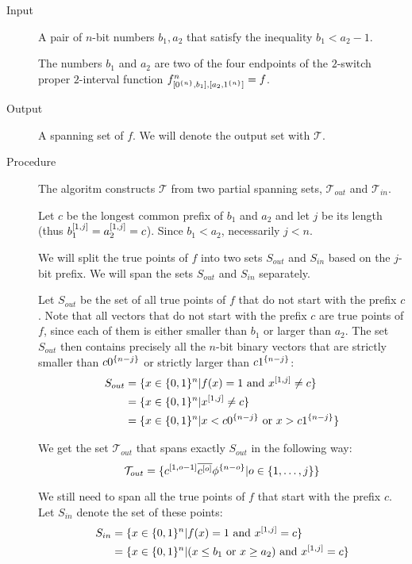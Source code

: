 \begin{description}
\item[Input] A pair of $n$-bit numbers $b_1, a_2$ that satisfy the inequality $b_1 < a_2 - 1$.

The numbers $b_1$ and $a_2$
are two of the four endpoints
of the $2$-switch proper
$2$-interval
function $f^{n}_{[0^{\{n\}}, b_1], [a_2, 1^{\{n\}}]} = f$.

\item[Output] A spanning set of $f$.
We will denote the output set with $\mathcal{T}$.

\item[Procedure]
The algoritm constructs $\mathcal{T}$ from two partial spanning sets, $\mathcal{T}_{out}$ and $\mathcal{T}_{in}$.

Let $c$ be the longest common prefix of $b_1$ and $a_2$
and let $j$ be its length
(thus $b_1^{[1, j]} = a_2^{[1, j]} = c$).
Since $b_1 < a_2$, necessarily $j < n$.

We will split the true points of $f$
into two sets $S_{out}$ and $S_{in}$
based on the $j$-bit prefix.
We will span the sets $S_{out}$ and $S_{in}$ separately.

Let $S_{out}$ be the set of all true points of $f$
that do not start with the prefix $c$.
Note that all vectors
that do not start with the prefix $c$
are true points of $f$,
since each of them is either smaller than $b_1$
or larger than $a_2$.
The set $S_{out}$ then contains precisely
all the $n$-bit binary vectors
that are strictly smaller than $c 0^{\{n-j\}}$
or strictly larger than $c 1^{\{n-j\}}$:
\begin{align*}
S_{out}
&= \{x \in \{0, 1\}^n
| f(x) = 1 \text{ and } x^{[1, j]} \neq c\} \\
&= \{x \in \{0, 1\}^n
| x^{[1, j]} \neq c\} \\
&= \{x \in \{0, 1\}^n
| x < c 0^{\{n-j\}} \text{ or } x > c 1^{\{n-j\}}\}
\end{align*}

We get the set $\mathcal{T}_{out}$ that spans exactly
$S_{out}$
in the following way:
$$
\mathcal{T}_{out} = \{c^{[1, o-1]} \overline{c^{[o]}} \phi^{\{n-o\}} | o \in \{1, \ldots, j\}\}
$$


We still need to span all the true points of $f$
that start with the prefix $c$.
Let $S_{in}$ denote the set of these points:
\begin{align*}
S_{in}
&= \{x \in \{0, 1\}^n
| f(x) = 1 \text{ and } x^{[1, j]} = c\} \\
&= \{x \in \{0, 1\}^n
| (x \leq b_1 \text{ or } x \geq a_2) \text{ and } x^{[1, j]} = c\}
\end{align*}


\end{description}
